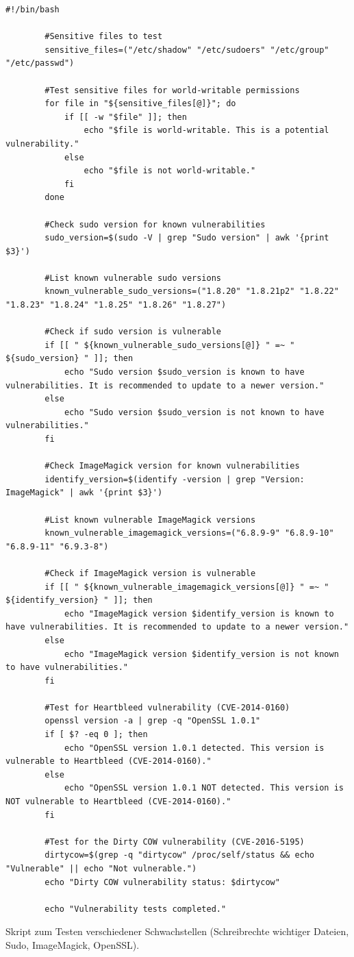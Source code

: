 \documentclass[10pt, a4paper,onecolumn ,titlepage]{article}
\begin{document}
    \begin{lstlisting}[label={lst:schwachstellentestSkript}]
        #!/bin/bash

        #Sensitive files to test
        sensitive_files=("/etc/shadow" "/etc/sudoers" "/etc/group" "/etc/passwd")

        #Test sensitive files for world-writable permissions
        for file in "${sensitive_files[@]}"; do
            if [[ -w "$file" ]]; then
                echo "$file is world-writable. This is a potential vulnerability."
            else
                echo "$file is not world-writable."
            fi
        done

        #Check sudo version for known vulnerabilities
        sudo_version=$(sudo -V | grep "Sudo version" | awk '{print $3}')

        #List known vulnerable sudo versions
        known_vulnerable_sudo_versions=("1.8.20" "1.8.21p2" "1.8.22" "1.8.23" "1.8.24" "1.8.25" "1.8.26" "1.8.27")

        #Check if sudo version is vulnerable
        if [[ " ${known_vulnerable_sudo_versions[@]} " =~ " ${sudo_version} " ]]; then
            echo "Sudo version $sudo_version is known to have vulnerabilities. It is recommended to update to a newer version."
        else
            echo "Sudo version $sudo_version is not known to have vulnerabilities."
        fi

        #Check ImageMagick version for known vulnerabilities
        identify_version=$(identify -version | grep "Version: ImageMagick" | awk '{print $3}')

        #List known vulnerable ImageMagick versions
        known_vulnerable_imagemagick_versions=("6.8.9-9" "6.8.9-10" "6.8.9-11" "6.9.3-8")

        #Check if ImageMagick version is vulnerable
        if [[ " ${known_vulnerable_imagemagick_versions[@]} " =~ " ${identify_version} " ]]; then
            echo "ImageMagick version $identify_version is known to have vulnerabilities. It is recommended to update to a newer version."
        else
            echo "ImageMagick version $identify_version is not known to have vulnerabilities."
        fi

        #Test for Heartbleed vulnerability (CVE-2014-0160)
        openssl version -a | grep -q "OpenSSL 1.0.1"
        if [ $? -eq 0 ]; then
            echo "OpenSSL version 1.0.1 detected. This version is vulnerable to Heartbleed (CVE-2014-0160)."
        else
            echo "OpenSSL version 1.0.1 NOT detected. This version is NOT vulnerable to Heartbleed (CVE-2014-0160)."
        fi

        #Test for the Dirty COW vulnerability (CVE-2016-5195)
        dirtycow=$(grep -q "dirtycow" /proc/self/status && echo "Vulnerable" || echo "Not vulnerable.")
        echo "Dirty COW vulnerability status: $dirtycow"

        echo "Vulnerability tests completed."
    \end{lstlisting} Skript zum Testen verschiedener Schwachstellen (Schreibrechte wichtiger Dateien, Sudo, ImageMagick, OpenSSL).
\end{document}
